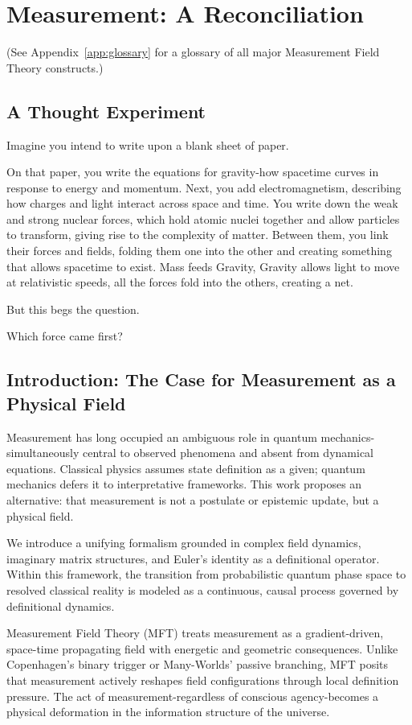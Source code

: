 \chapter{Measurement: A Reconciliation}

(See Appendix~\ref{app:glossary} for a glossary of all major Measurement Field Theory constructs.)


\section{A Thought Experiment}
Imagine you intend to write upon a blank sheet of paper.

On that paper, you write the equations for gravity-how spacetime curves in response to energy and momentum.
Next, you add electromagnetism, describing how charges and light interact across space and time.
You write down the weak and strong nuclear forces, which hold atomic nuclei together and allow particles to transform, giving rise to the complexity of matter.
Between them, you link their forces and fields, folding them one into the other and creating something that allows spacetime to exist. 
Mass feeds Gravity, Gravity allows light to move at relativistic speeds, all the forces fold into the others, creating a net.

But this begs the question. 

Which force came first? 

\section{Introduction: The Case for Measurement as a Physical Field}

Measurement has long occupied an ambiguous role in quantum mechanics-simultaneously central to observed phenomena and absent from dynamical equations. Classical physics assumes state definition as a given; quantum mechanics defers it to interpretative frameworks. This work proposes an alternative: that measurement is not a postulate or epistemic update, but a physical field.

We introduce a unifying formalism grounded in complex field dynamics, imaginary matrix structures, and Euler's identity as a definitional operator. Within this framework, the transition from probabilistic quantum phase space to resolved classical reality is modeled as a continuous, causal process governed by definitional dynamics.

Measurement Field Theory (MFT) treats measurement as a gradient-driven, space-time propagating field with energetic and geometric consequences. Unlike Copenhagen's binary trigger or Many-Worlds' passive branching, MFT posits that measurement actively reshapes field configurations through local definition pressure. The act of measurement-regardless of conscious agency-becomes a physical deformation in the information structure of the universe.

